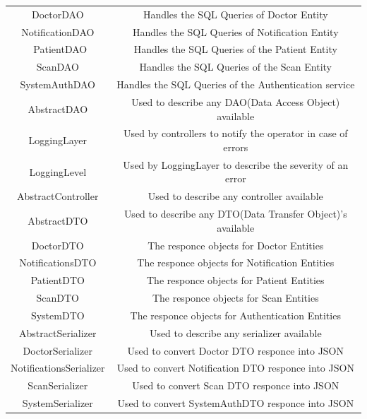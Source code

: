 		\begin{center}
			\begin{tabular}{ |c|c| } 
				\hline
				DoctorDAO & Handles the SQL Queries of Doctor Entity \\
				NotificationDAO & Handles the SQL Queries of Notification Entity  \\\
				PatientDAO & Handles the SQL Queries of the Patient Entity\\
				ScanDAO & Handles the SQL Queries of the Scan Entity\\
				SystemAuthDAO & Handles the SQL Queries of the Authentication service\\
				AbstractDAO & Used to describe any DAO(Data Access Object) available\\
				LoggingLayer & Used by controllers to notify the operator in case of errors\\
				LoggingLevel &Used by LoggingLayer to describe the severity of an error\\
				AbstractController & Used to describe any controller available\\
				AbstractDTO & Used to describe any DTO(Data Transfer Object)'s available\\
				DoctorDTO & The responce objects for Doctor Entities\\
				NotificationsDTO & The responce objects for Notification Entities\\
				PatientDTO & The responce objects for Patient Entities\\
				ScanDTO & The responce objects for Scan Entities\\
				SystemDTO & The responce objects for Authentication Entities\\
				AbstractSerializer & Used to describe any serializer available\\
				DoctorSerializer & Used to convert Doctor DTO responce into JSON\\
				NotificationsSerializer & Used to convert Notification DTO responce into JSON\\
				ScanSerializer & Used to convert Scan DTO responce into JSON\\
				SystemSerializer & Used to convert SystemAuthDTO responce into JSON\\
				\hline
			\end{tabular}
		\end{center}
